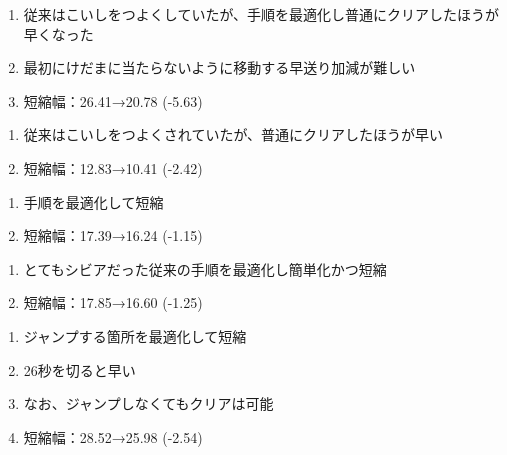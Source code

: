 \begin{enumerate}[label={\sarrow}]
\item 従来はこいしをつよくしていたが、手順を最適化し普通にクリアしたほうが早くなった
\item 最初にけだまに当たらないように移動する早送り加減が難しい
\item 短縮幅：26.41→20.78 (-5.63)
\end{enumerate}



\begin{enumerate}[label={\sarrow}]
\item 従来はこいしをつよくされていたが、普通にクリアしたほうが早い
\item 短縮幅：12.83→10.41 (-2.42)
\end{enumerate}



\clearpage
\begin{enumerate}[label={\sarrow}]
\item 手順を最適化して短縮
\item 短縮幅：17.39→16.24 (-1.15)
\end{enumerate}



\begin{enumerate}[label={\sarrow}]
\item とてもシビアだった従来の手順を最適化し簡単化かつ短縮
\item 短縮幅：17.85→16.60 (-1.25)
\end{enumerate}



\begin{enumerate}[label={\sarrow}]
\item ジャンプする箇所を最適化して短縮
\item 26秒を切ると早い
\item なお、ジャンプしなくてもクリアは可能
\item 短縮幅：28.52→25.98 (-2.54)
\end{enumerate}



